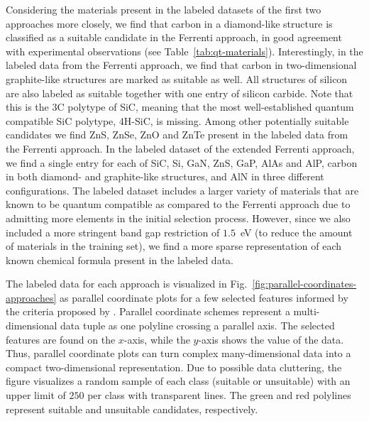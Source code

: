 \documentclass[superscriptaddress,unsortedaddress,
 amsmath,amssymb,
 aps,
]{revtex4-2}
\begin{document}
 
Considering the materials present in the labeled datasets of the first two approaches more closely, we find that carbon in a diamond-like structure is classified as a suitable candidate in the Ferrenti approach, in good agreement with experimental observations (see Table~\ref{tab:qt-materials}). Interestingly, in the labeled data from the Ferrenti approach, we find that carbon in two-dimensional graphite-like structures are marked as suitable as well. All structures of silicon are also labeled as suitable together with one entry of silicon carbide. Note that this is the $3$C polytype of SiC, meaning that the most well-established quantum compatible SiC polytype, $4$H-SiC, is missing. 
Among other potentially suitable candidates we find ZnS, ZnSe, ZnO and ZnTe present in the labeled data from the Ferrenti approach.  
In the labeled dataset of the extended Ferrenti approach, we find a single entry for each of SiC, Si, GaN, ZnS, GaP, AlAs and AlP, carbon in both diamond- and graphite-like structures, and AlN in three different configurations. The labeled dataset includes a larger variety of materials that are known to be quantum compatible as compared to the Ferrenti approach due to admitting more elements in the initial selection process. However, since we also included a more stringent band gap restriction of $1.5$~eV (to reduce the amount of materials in the training set), we find a more sparse representation of each known chemical formula present in the labeled data. 

The labeled data for each approach is visualized in Fig.~\ref{fig:parallel-coordinates-approaches} as parallel coordinate plots for a few selected features informed by the criteria proposed by \citeauthor{Weber2010} \cite{Weber2010}. Parallel coordinate schemes  \cite{Inselberga1990, Inselberg1985} represent a multi-dimensional data tuple as one polyline crossing a parallel axis. The selected features are found on the $x$-axis, while the $y$-axis shows the value of the data. Thus, parallel coordinate plots can turn complex many-dimensional data into a compact  two-dimensional representation. Due to possible data cluttering, the figure visualizes a random sample of each class (suitable or unsuitable) with an upper limit of $250$ per class with transparent lines. The green and red polylines represent suitable and unsuitable candidates, respectively. 
\end{document}
